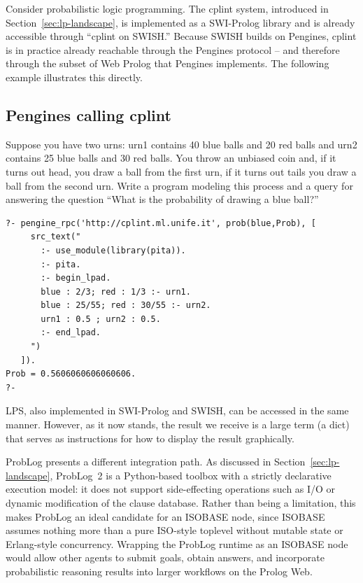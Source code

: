 Consider probabilistic logic programming. The cplint system, introduced in Section~\ref{sec:lp-landscape}, is implemented as a SWI-Prolog library and is already accessible through ``cplint on SWISH.'' Because SWISH builds on Pengines, cplint is in practice already reachable through the Pengines protocol -- and therefore through the subset of Web Prolog that Pengines implements. The following example illustrates this directly.

\subsection*{Pengines calling cplint}

Suppose you have two urns: urn1 contains 40 blue balls and 20 red balls and urn2 contains 25 blue balls and 30 red balls. You throw an unbiased coin and, if it turns out head, you draw a ball from the first urn, if it turns out tails you draw a ball from the second urn. Write a program modeling this process and a query for answering the question ``What is the probability of drawing a blue ball?''

\begin{verbatim}
?- pengine_rpc('http://cplint.ml.unife.it', prob(blue,Prob), [
     src_text("
       :- use_module(library(pita)).
       :- pita.
       :- begin_lpad.
       blue : 2/3; red : 1/3 :- urn1.
       blue : 25/55; red : 30/55 :- urn2.
       urn1 : 0.5 ; urn2 : 0.5.
       :- end_lpad.
     ")
   ]).
Prob = 0.5606060606060606.
?-
\end{verbatim}


\noindent
LPS, also implemented in SWI-Prolog and SWISH, can be accessed in the same manner. However, as it now stands, the result we receive is a large term (a dict) that serves as instructions for how to display the result graphically.

ProbLog presents a different integration path. As discussed in Section~\ref{sec:lp-landscape}, ProbLog~2 is a Python-based toolbox with a strictly declarative execution model: it does not support side-effecting operations such as I/O or dynamic modification of the clause database. Rather than being a limitation, this makes ProbLog an ideal candidate for an ISOBASE node, since ISOBASE assumes nothing more than a pure ISO-style toplevel without mutable state or Erlang-style concurrency. Wrapping the ProbLog runtime as an ISOBASE node would allow other agents to submit goals, obtain answers, and incorporate probabilistic reasoning results into larger workflows on the Prolog Web.

